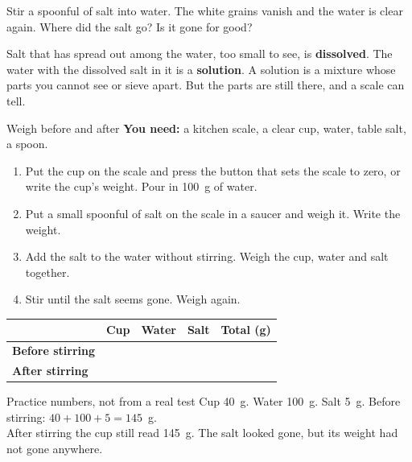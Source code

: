\label{ch3}

Stir a spoonful of salt into water. The white grains vanish and the water is clear again. Where did the salt go? Is it gone for good?

Salt that has spread out among the water, too small to see, is \textbf{dissolved}. The water with the dissolved salt in it is a \textbf{solution}. A solution is a mixture whose parts you cannot see or sieve apart. But the parts are still there, and a scale can tell.

\begin{tryit}{Weigh before and after}
\textbf{You need:} a kitchen scale, a clear cup, water, table salt, a spoon.
\begin{enumerate}[leftmargin=1.6em]
\item Put the cup on the scale and press the button that sets the scale to zero, or write the cup's weight. Pour in 100~g of water.
\item Put a small spoonful of salt on the scale in a saucer and weigh it. Write the weight.
\item Add the salt to the water without stirring. Weigh the cup, water and salt together.
\item Stir until the salt seems gone. Weigh again.
\end{enumerate}
\par\medskip
\renewcommand{\arraystretch}{1.6}
\begin{tabular}{|l|c|c|c|c|}
\hline
 & \textbf{Cup} & \textbf{Water} & \textbf{Salt} & \textbf{Total (g)}\\ \hline
\textbf{Before stirring} & & & & \\ \hline
\textbf{After stirring} & & & & \\ \hline
\end{tabular}
\end{tryit}

\begin{worked}{Practice numbers, not from a real test}
Cup 40~g. Water 100~g. Salt 5~g. Before stirring: $40+100+5=145$~g.\\
After stirring the cup still read 145~g. The salt looked gone, but its weight had not gone anywhere.
\end{worked}

\begin{center}
\end{center}


